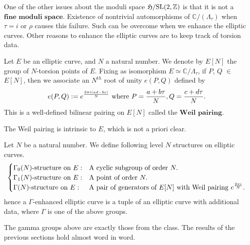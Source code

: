 \documentclass[a4paper,11pt]{article}
\begin{document}
One of the other issues about the moduli space $\mathfrak{H}/\textnormal{SL}(2,\mathbb{Z})$ is that it is not a $\textbf{fine moduli space}$.
Existence of nontrivial automorphisms of $\mathbb{C}/(\Lambda_{\tau})$ when $\tau=i$ or $\rho$ causes this failure.
Such can be overcome when we enhance the elliptic curves.
Other reasons to enhance the elliptic curves are to keep track of torsion data.


\begin{defn}
Let $E$ be an elliptic curve, and $N$ a natural number.
We denote by $E[N]$ the group of $N$-torsion points of $E$.
Fixing as isomorphism $E\simeq\mathbb{C}/\Lambda_{\tau}$, if $P$, $Q$ $\in$ $E[N]$, then we associate an $N^{th}$ root of unity $e(P,Q)$ defined by
\[
e(P,Q):=e^{\frac{2\pi i(ad-bc)}{N}} \textnormal{ where } P=\frac{a+b\tau}{N}, Q=\frac{c+d\tau}{N}.
\]
This is a well-defined bilinear pairing on $E[N]$ called the $\textbf{Weil pairing}$.
\end{defn}

The Weil pairing is intrinsic to $E$, which is not a priori clear.

\begin{defn}
Let $N$ be a natural number.
We define following level $N$ structures on elliptic curves.
\[
\begin{cases}
\Gamma_0(N)\textnormal{-structure on }E: & \textnormal{A cyclic subgroup of order }N.\\
\Gamma_1(N)\textnormal{-structure on }E: & \textnormal{A point of order }N.\\
\Gamma(N)\textnormal{-structure on }E: & \textnormal{A pair of generators of }E[N] \textnormal{ with Weil pairing } e^{\frac{2\pi i}{N}}.
\end{cases}
\]
hence a $\Gamma$-enhanced elliptic curve is a tuple of an elliptic curve with additional data, where $\Gamma$ is one of the above groups.
\end{defn}

The gamma groups above are exactly those from the class.
The results of the previous sections hold almost word in word.
\end{document}
